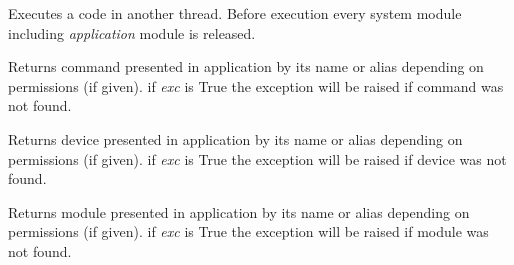 \documentclass[letterpaper,10pt,english]{sphinxmanual}
\begin{document}
\begin{fulllineitems}

\begin{fulllineitems}
\label{sysmod:pyfrid.modules.system.app.BaseApplicationModule.execute_code}
Executes a code in another thread. Before execution every system module including \emph{application} module is released.

\end{fulllineitems}


\begin{fulllineitems}
\label{sysmod:pyfrid.modules.system.app.BaseApplicationModule.get_command}
Returns command presented in application by its name or alias depending on permissions (if given).
if \emph{exc} is True the exception will be raised if command was not found.

\end{fulllineitems}


\begin{fulllineitems}
\label{sysmod:pyfrid.modules.system.app.BaseApplicationModule.get_device}
Returns device presented in application by its name or alias depending on permissions (if given).
if \emph{exc} is True the exception will be raised if device was not found.

\end{fulllineitems}


\begin{fulllineitems}
\label{sysmod:pyfrid.modules.system.app.BaseApplicationModule.get_module}
Returns module presented in application by its name or alias depending on permissions (if given).
if \emph{exc} is True the exception will be raised if module was not found.


\end{fulllineitems}
\end{fulllineitems}
\end{document}

